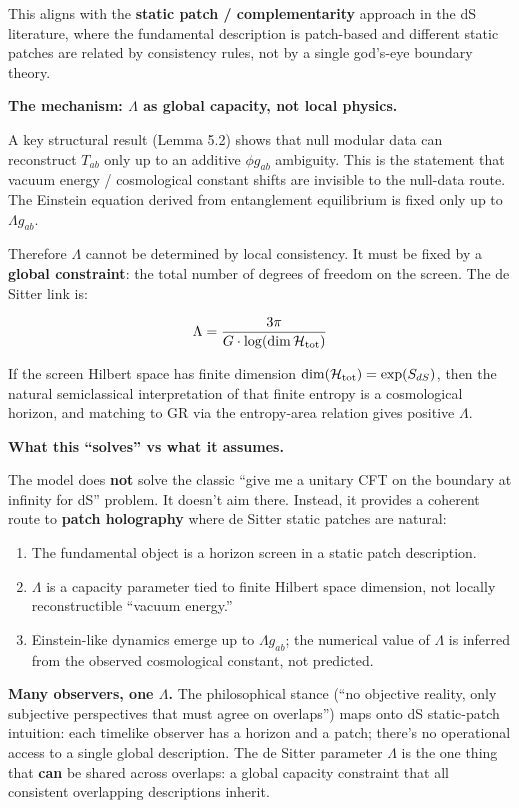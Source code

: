 \documentclass[
]{article}
\providecommand{\tightlist}{%
  \setlength{\itemsep}{0pt}\setlength{\parskip}{0pt}}
\begin{document}
This aligns with the \textbf{static patch / complementarity} approach in
the dS literature, where the fundamental description is patch-based and
different static patches are related by consistency rules, not by a
single god's-eye boundary theory.

\textbf{The mechanism: \(\Lambda\) as global capacity, not local
physics.}

A key structural result (Lemma 5.2) shows that null modular data can
reconstruct \(T_{ab}\) only up to an additive \(\phi g_{ab}\) ambiguity.
This is the statement that vacuum energy / cosmological constant shifts
are invisible to the null-data route. The Einstein equation derived from
entanglement equilibrium is fixed only up to \(\Lambda g_{ab}\).

Therefore \(\Lambda\) cannot be determined by local consistency. It must
be fixed by a \textbf{global constraint}: the total number of degrees of
freedom on the screen. The de Sitter link is:

\[
\Lambda = \frac{3\pi}{G \cdot \log(\dim \mathcal{H}_{\rm tot})}
\]

If the screen Hilbert space has finite dimension
\(\dim(\mathcal{H}_{\rm tot})
= \exp(S_{dS})\), then the natural semiclassical interpretation of that
finite entropy is a cosmological horizon, and matching to GR via the
entropy-area relation gives positive \(\Lambda\).

\textbf{What this ``solves'' vs what it assumes.}

The model does \textbf{not} solve the classic ``give me a unitary CFT on
the boundary at infinity for dS'' problem. It doesn't aim there.
Instead, it provides a coherent route to \textbf{patch holography} where
de Sitter static patches are natural:

\begin{enumerate}
\def\labelenumi{\arabic{enumi}.}
\tightlist
\item
  The fundamental object is a horizon screen in a static patch
  description.
\item
  \(\Lambda\) is a capacity parameter tied to finite Hilbert space
  dimension, not locally reconstructible ``vacuum energy.''
\item
  Einstein-like dynamics emerge up to \(\Lambda g_{ab}\); the numerical
  value of \(\Lambda\) is inferred from the observed cosmological
  constant, not predicted.
\end{enumerate}

\textbf{Many observers, one \(\Lambda\).} The philosophical stance (``no
objective reality, only subjective perspectives that must agree on
overlaps'') maps onto dS static-patch intuition: each timelike observer
has a horizon and a patch; there's no operational access to a single
global description. The de Sitter parameter \(\Lambda\) is the one thing
that \textbf{can} be shared across overlaps: a global capacity
constraint that all consistent overlapping descriptions inherit.
\end{document}
